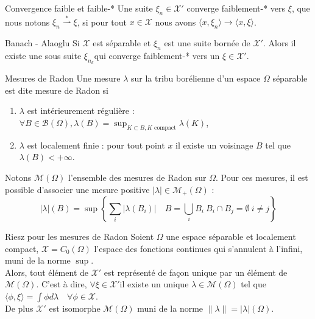 \documentclass[a4paper,12pt]{article}
\begin{document}
\begin{appendices}
\begin{definition}{Convergence faible et faible-*}
Une suite $\xi_n\in\mathcal{X}'$ converge faiblement-* vers $\xi$, que nous notons $\xi_n \overset{\ast}{\rightharpoonup}\xi$, si pour tout $x\in \mathcal{X}$ nous avons $\langle
x,\xi_n\rangle\rightarrow\langle x,\xi\rangle$.

\end{definition}

\begin{theoreme}{Banach - Alaoglu}
Si $\mathcal{X}$ est séparable et $\xi_n$ est une suite bornée de $\mathcal{X}'$. Alors il existe une sous suite $\xi_{n_k}$qui converge faiblement-* vers un $\xi\in\mathcal{X}'$.  
\end{theoreme}

\begin{definition}{Mesures de Radon}
Une mesure $\lambda$ sur la tribu borélienne d'un espace $\Omega$ séparable est dite mesure de Radon si 
\begin{enumerate}
\item $\lambda$ est intérieurement régulière : $\forall B\in\mathcal{B}(\Omega), \lambda (B) = \sup_{K\subset B, K \text{ compact}} \lambda (K)$,
\item $\lambda$ est localement finie : pour tout point $x$ il existe un voisinage $B$ tel que $\lambda (B) < +\infty$. 
\end{enumerate}
Notons $\mathcal{M}(\Omega)$ l'ensemble des mesures de Radon sur $\Omega$. Pour ces mesures, il est possible d'associer une mesure positive $|\lambda |\in \mathcal{M}_+(\Omega)$ : 
$$
|\lambda |(B) = \sup \left\{ \sum_i |\lambda (B_i)| \quad B = \bigcup_i B_i \ B_i\cap B_j = \emptyset \ i\neq j \right\}
$$
\end{definition}

\begin{theoreme}{Riesz pour les mesures de Radon}
Soient $\Omega$ une espace séparable et localement compact, $\mathcal{X} = C_0(\Omega)$ l'espace des fonctions continues qui s'annulent à l'infini, muni de la norme $\sup$. \\
Alors, tout élément de $\mathcal{X}'$ est représenté de façon unique par un élément de $\mathcal{M}(\Omega)$. C'est à dire, $\forall \xi\in\mathcal{X}'$il existe un unique $\lambda\in\mathcal{M}(\Omega)$ tel que $\langle \phi,\xi \rangle =\int \phi d\lambda\quad\forall\phi\in\mathcal{X}$. \\
De plus $\mathcal{X}'$ est isomorphe $\mathcal{M}(\Omega)$ muni de la norme $\|\lambda\|=|\lambda|(\Omega)$. 
\end{theoreme}


\end{appendices}
\end{document}
